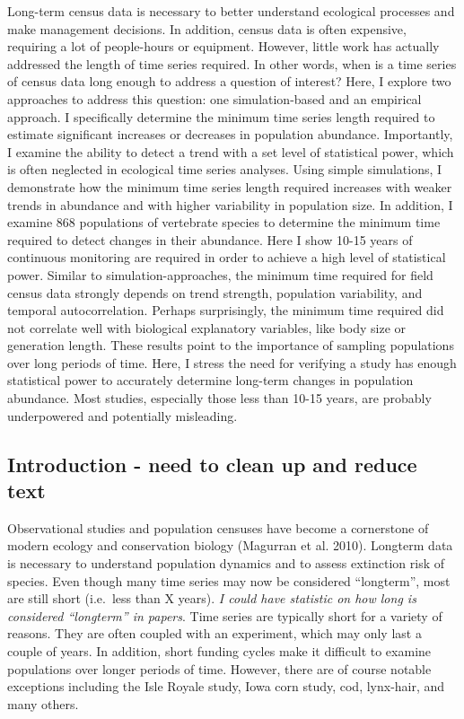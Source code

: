 \documentclass[12pt,]{article}
\begin{document}
Long-term census data is necessary to better understand ecological
processes and make management decisions. In addition, census data is
often expensive, requiring a lot of people-hours or equipment. However,
little work has actually addressed the length of time series required.
In other words, when is a time series of census data long enough to
address a question of interest? Here, I explore two approaches to
address this question: one simulation-based and an empirical approach. I
specifically determine the minimum time series length required to
estimate significant increases or decreases in population abundance.
Importantly, I examine the ability to detect a trend with a set level of
statistical power, which is often neglected in ecological time series
analyses. Using simple simulations, I demonstrate how the minimum time
series length required increases with weaker trends in abundance and
with higher variability in population size. In addition, I examine 868
populations of vertebrate species to determine the minimum time required
to detect changes in their abundance. Here I show 10-15 years of
continuous monitoring are required in order to achieve a high level of
statistical power. Similar to simulation-approaches, the minimum time
required for field census data strongly depends on trend strength,
population variability, and temporal autocorrelation. Perhaps
surprisingly, the minimum time required did not correlate well with
biological explanatory variables, like body size or generation length.
These results point to the importance of sampling populations over long
periods of time. Here, I stress the need for verifying a study has
enough statistical power to accurately determine long-term changes in
population abundance. Most studies, especially those less than 10-15
years, are probably underpowered and potentially misleading.

\subsection{Introduction - need to clean up and reduce
text}\label{introduction---need-to-clean-up-and-reduce-text}

Observational studies and population censuses have become a cornerstone
of modern ecology and conservation biology (Magurran et al. 2010).
Longterm data is necessary to understand population dynamics and to
assess extinction risk of species. Even though many time series may now
be considered ``longterm'', most are still short (i.e.~less than X
years). \emph{I could have statistic on how long is considered
``longterm'' in papers}. Time series are typically short for a variety
of reasons. They are often coupled with an experiment, which may only
last a couple of years. In addition, short funding cycles make it
difficult to examine populations over longer periods of time. However,
there are of course notable exceptions including the Isle Royale study,
Iowa corn study, cod, lynx-hair, and many others.
\end{document}
